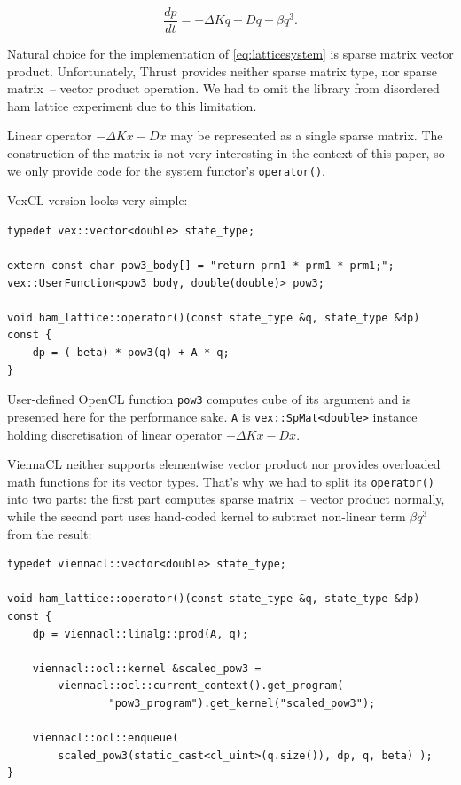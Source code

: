 \documentclass[1p]{elsarticle}
\newcommand{\code}[1]{\lstinline|#1|}
\begin{document}
\begin{equation} \label{eq:latticesystem}
    \frac{dp}{dt} = -\Delta Kq + Dq - \beta q^3.
\end{equation}

Natural choice for the implementation of \eqref{eq:latticesystem} is sparse
matrix vector product. Unfortunately, Thrust provides neither sparse matrix
type, nor sparse matrix~-- vector product operation.  We had to omit the
library from disordered ham lattice experiment due to this limitation.

Linear operator $-\Delta Kx-Dx$ may be represented as a single sparse matrix.
The construction of the matrix is not very interesting in the context of this
paper, so we only provide code for the system functor's \code{operator()}.

VexCL version looks very simple:
\begin{lstlisting}[frame=leftline]
typedef vex::vector<double> state_type;

extern const char pow3_body[] = "return prm1 * prm1 * prm1;";
vex::UserFunction<pow3_body, double(double)> pow3;

void ham_lattice::operator()(const state_type &q, state_type &dp) const {
    dp = (-beta) * pow3(q) + A * q;
}
\end{lstlisting}

User-defined OpenCL function \code{pow3} computes cube of its argument and is
presented here for the performance sake. \code{A} is \code{vex::SpMat<double>}
instance holding discretisation of linear operator $-\Delta Kx - Dx$.

ViennaCL neither supports elementwise vector product nor provides
overloaded math functions for its vector types. That's why we had to split its
\code{operator()} into two parts: the first part computes sparse matrix~--
vector product normally, while the second part uses hand-coded kernel to
subtract non-linear term $\beta q^3$ from the result:
\begin{lstlisting}[frame=leftline]
typedef viennacl::vector<double> state_type;

void ham_lattice::operator()(const state_type &q, state_type &dp) const {
    dp = viennacl::linalg::prod(A, q);

    viennacl::ocl::kernel &scaled_pow3 =
        viennacl::ocl::current_context().get_program(
                "pow3_program").get_kernel("scaled_pow3");

    viennacl::ocl::enqueue(
        scaled_pow3(static_cast<cl_uint>(q.size()), dp, q, beta) );
}
\end{lstlisting}
\end{document}
